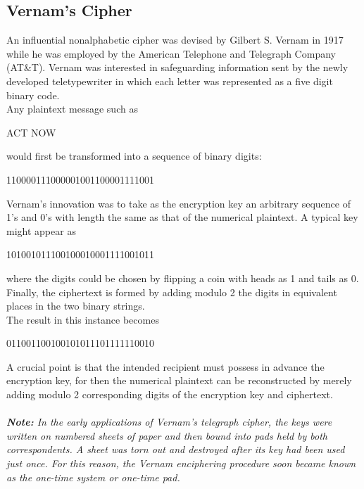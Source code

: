 \documentclass{article}
\begin{document}
\subsection{Vernam's Cipher}
An influential nonalphabetic cipher was devised by Gilbert S. Vernam in 1917 while he was employed by the American Telephone and Telegraph Company (AT\&T). Vernam was interested in safeguarding information sent by the newly developed teletypewriter in which each letter was represented as a five digit binary code.\\
Any plaintext message such as
\begin{center}
    ACT NOW
\end{center}
would first be transformed into a sequence of binary digits:
\begin{center}
    110000111000001001100001111001
\end{center}
Vernam's innovation was to take as the encryption key an arbitrary sequence of 1's and 0's with length the same as that of the numerical plaintext. A typical key might appear as
\begin{center}
    101001011100100010001111001011
\end{center}
where the digits could be chosen by flipping a coin with heads as 1 and tails as 0.\\
Finally, the ciphertext is formed by adding modulo 2 the digits in equivalent places in the two binary strings.\\ The result in this instance becomes
\begin{center}
    011001100100101011101111110010
\end{center}
A crucial point is that the intended recipient must possess in advance the encryption key, for then the numerical plaintext can be reconstructed by merely adding modulo 2 corresponding digits of the encryption key and ciphertext.\\ \\
{\it {\bf Note:} In the early applications of Vernam's telegraph cipher, the keys were written on numbered sheets of paper and then bound into pads held by both correspondents. A sheet was torn out and destroyed after its key had been used just once. For this reason, the Vernam enciphering procedure soon became known as the one-time system or one-time pad.}
\end{document}
